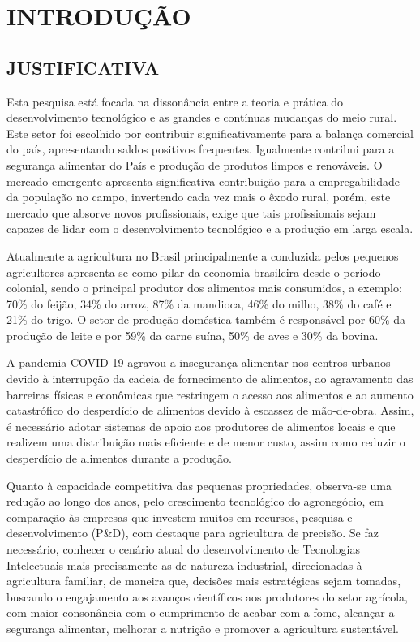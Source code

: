 \chapter{INTRODUÇÃO}



\section{JUSTIFICATIVA}

Esta pesquisa está focada na dissonância entre a teoria e prática do desenvolvimento tecnológico e as grandes e contínuas mudanças do meio rural. Este setor foi escolhido por contribuir significativamente para a balança comercial do país, apresentando saldos positivos frequentes. Igualmente contribui para a segurança alimentar do País e produção de produtos limpos e renováveis. O mercado emergente apresenta significativa contribuição para a empregabilidade da população no campo, invertendo cada vez mais o êxodo rural, porém, este mercado que absorve novos profissionais, exige que tais profissionais sejam capazes de lidar com o desenvolvimento tecnológico e a produção em larga escala. 

Atualmente a agricultura no Brasil principalmente a conduzida pelos pequenos agricultores apresenta-se como pilar da economia brasileira desde o período colonial, sendo o principal produtor dos alimentos mais consumidos, a exemplo: 70\% do feijão, 34\% do arroz, 87\% da mandioca, 46\% do milho, 38\% do café e 21\% do trigo. O setor de produção doméstica também é responsável por 60\% da produção de leite e por 59\% da carne suína, 50\% de aves e 30\% da bovina. 

A pandemia COVID-19 agravou a insegurança alimentar nos centros urbanos devido à interrupção da cadeia de fornecimento de alimentos, ao agravamento das barreiras físicas e econômicas que restringem o acesso aos alimentos e ao aumento catastrófico do desperdício de alimentos devido à escassez de mão-de-obra. Assim, é necessário adotar sistemas de apoio aos produtores de alimentos locais e que realizem uma distribuição mais eficiente e de menor custo, assim como reduzir o desperdício de alimentos durante a produção. 

Quanto à capacidade competitiva das pequenas propriedades, observa-se uma redução ao longo dos anos, pelo crescimento tecnológico do agronegócio, em comparação às empresas que investem muitos em recursos, pesquisa e desenvolvimento (P\&D), com destaque para agricultura de precisão. Se faz necessário, conhecer o cenário atual do desenvolvimento de Tecnologias Intelectuais mais precisamente as de natureza industrial, direcionadas à agricultura familiar, de maneira que, decisões mais estratégicas sejam tomadas, buscando o engajamento aos avanços científicos aos produtores do setor agrícola, com maior consonância com o cumprimento de acabar com a fome, alcançar a segurança alimentar, melhorar a nutrição e promover a agricultura sustentável.

